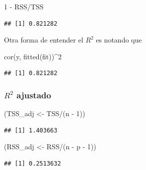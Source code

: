 \documentclass[
  12pt,
]{book}
\newenvironment{Shaded}{\begin{snugshade}}{\end{snugshade}}
\newcommand{\DecValTok}[1]{\textcolor[rgb]{0.00,0.00,0.81}{#1}}
\newcommand{\FunctionTok}[1]{\textcolor[rgb]{0.00,0.00,0.00}{#1}}
\newcommand{\NormalTok}[1]{#1}
\newcommand{\OtherTok}[1]{\textcolor[rgb]{0.56,0.35,0.01}{#1}}
\newcommand{\SpecialCharTok}[1]{\textcolor[rgb]{0.00,0.00,0.00}{#1}}
\theoremstyle{definition}
\theoremstyle{definition}
\theoremstyle{definition}
\theoremstyle{remark}
\begin{document}
\begin{Shaded}
\begin{Highlighting}[]
\DecValTok{1} \SpecialCharTok{{-}}\NormalTok{ RSS}\SpecialCharTok{/}\NormalTok{TSS}
\end{Highlighting}
\end{Shaded}

\begin{verbatim}
## [1] 0.821282
\end{verbatim}

Otra forma de entender el \(R^2\) es notando que

\begin{Shaded}
\begin{Highlighting}[]
\FunctionTok{cor}\NormalTok{(y, }\FunctionTok{fitted}\NormalTok{(fit))}\SpecialCharTok{\^{}}\DecValTok{2}
\end{Highlighting}
\end{Shaded}

\begin{verbatim}
## [1] 0.821282
\end{verbatim}

\hypertarget{r2-ajustado}{%
\subsubsection{\texorpdfstring{\(R^2\) ajustado}{R\^{}2 ajustado}}\label{r2-ajustado}}

\begin{Shaded}
\begin{Highlighting}[]
\NormalTok{(TSS\_adj }\OtherTok{\textless{}{-}}\NormalTok{ TSS}\SpecialCharTok{/}\NormalTok{(n }\SpecialCharTok{{-}} \DecValTok{1}\NormalTok{))}
\end{Highlighting}
\end{Shaded}

\begin{verbatim}
## [1] 1.403663
\end{verbatim}

\begin{Shaded}
\begin{Highlighting}[]
\NormalTok{(RSS\_adj }\OtherTok{\textless{}{-}}\NormalTok{ RSS}\SpecialCharTok{/}\NormalTok{(n }\SpecialCharTok{{-}}\NormalTok{ p }\SpecialCharTok{{-}} \DecValTok{1}\NormalTok{))}
\end{Highlighting}
\end{Shaded}

\begin{verbatim}
## [1] 0.2513632
\end{verbatim}
\end{document}
